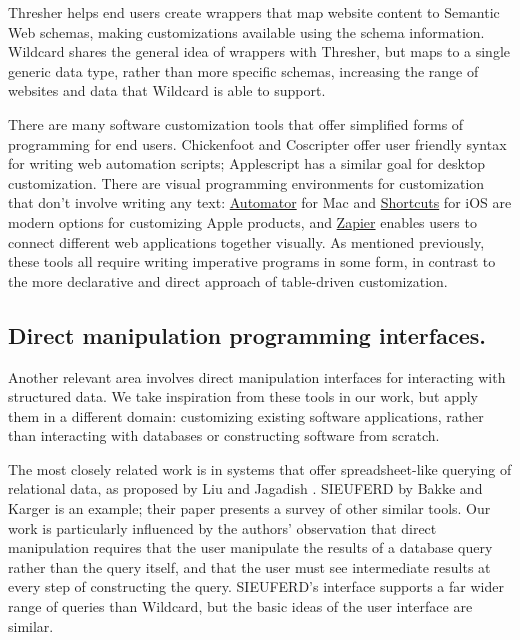 \documentclass[sigplan,screen,10pt,anonymous,review]{acmart}
\begin{document}
Thresher \citep{hogue2005} helps end users create wrappers that map
website content to Semantic Web schemas, making customizations available
using the schema information. Wildcard shares the general idea of
wrappers with Thresher, but maps to a single generic data type, rather
than more specific schemas, increasing the range of websites and data
that Wildcard is able to support.

There are many software customization tools that offer simplified forms
of programming for end users. Chickenfoot \citep{bolin2005} and
Coscripter \citep{leshed2008} offer user friendly syntax for writing web
automation scripts; Applescript \citep{cook2007} has a similar goal for
desktop customization. There are visual programming environments for
customization that don't involve writing any text:
\href{https://support.apple.com/guide/automator/welcome/mac}{Automator}
for Mac and
\href{https://apps.apple.com/us/app/shortcuts/id915249334}{Shortcuts}
for iOS are modern options for customizing Apple products, and
\href{https://zapier.com/}{Zapier} enables users to connect different
web applications together visually. As mentioned previously, these tools
all require writing imperative programs in some form, in contrast to the
more declarative and direct approach of table-driven customization.

\hypertarget{direct-manipulation-programming-interfaces.}{%
\subsection{Direct manipulation programming
interfaces.}\label{direct-manipulation-programming-interfaces.}}

Another relevant area involves direct manipulation interfaces for
interacting with structured data. We take inspiration from these tools
in our work, but apply them in a different domain: customizing existing
software applications, rather than interacting with databases or
constructing software from scratch.

The most closely related work is in systems that offer spreadsheet-like
querying of relational data, as proposed by Liu and Jagadish
\citep{liu2009}. SIEUFERD by Bakke and Karger \citep{bakke2016} is an
example; their paper presents a survey of other similar tools. Our work
is particularly influenced by the authors' observation that direct
manipulation requires that the user manipulate the results of a database
query rather than the query itself, and that the user must see
intermediate results at every step of constructing the query. SIEUFERD's
interface supports a far wider range of queries than Wildcard, but the
basic ideas of the user interface are similar.
\end{document}
